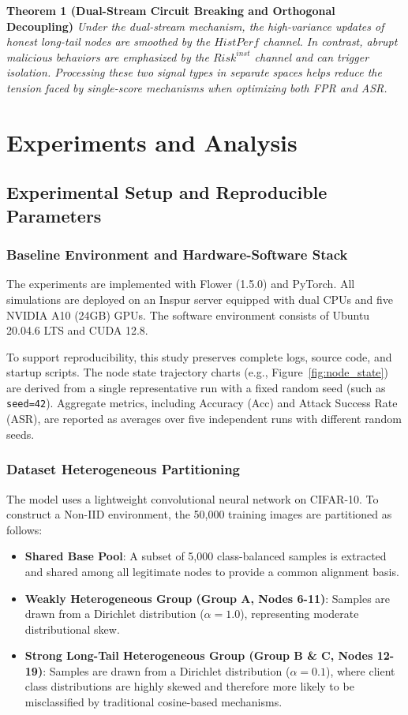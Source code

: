 \documentclass[runningheads,orivec]{llncs}
\begin{document}
\textbf{Theorem 1 (Dual-Stream Circuit Breaking and Orthogonal Decoupling)}
\textit{Under the dual-stream mechanism, the high-variance updates of honest long-tail nodes are smoothed by the $HistPerf$ channel. In contrast, abrupt malicious behaviors are emphasized by the $Risk^{inst}$ channel and can trigger isolation. Processing these two signal types in separate spaces helps reduce the tension faced by single-score mechanisms when optimizing both FPR and ASR.}

\section{Experiments and Analysis}
\label{sec:experiments}
\subsection{Experimental Setup and Reproducible Parameters}

\subsubsection{Baseline Environment and Hardware-Software Stack}
The experiments are implemented with Flower (1.5.0) and PyTorch. All simulations are deployed on an Inspur server equipped with dual CPUs and five NVIDIA A10 (24GB) GPUs. The software environment consists of Ubuntu 20.04.6 LTS and CUDA 12.8.

To support reproducibility, this study preserves complete logs, source code, and startup scripts. The node state trajectory charts (e.g., Figure~\ref{fig:node_state}) are derived from a single representative run with a fixed random seed (such as \texttt{seed=42}). Aggregate metrics, including Accuracy (Acc) and Attack Success Rate (ASR), are reported as averages over five independent runs with different random seeds.

\subsubsection{Dataset Heterogeneous Partitioning}
The model uses a lightweight convolutional neural network on CIFAR-10. To construct a Non-IID environment, the 50,000 training images are partitioned as follows:
\begin{itemize}
    \item \textbf{Shared Base Pool}: A subset of 5,000 class-balanced samples is extracted and shared among all legitimate nodes to provide a common alignment basis.
    \item \textbf{Weakly Heterogeneous Group (Group A, Nodes 6-11)}: Samples are drawn from a Dirichlet distribution ($\alpha=1.0$), representing moderate distributional skew.
    \item \textbf{Strong Long-Tail Heterogeneous Group (Group B \& C, Nodes 12-19)}: Samples are drawn from a Dirichlet distribution ($\alpha=0.1$), where client class distributions are highly skewed and therefore more likely to be misclassified by traditional cosine-based mechanisms.
\end{itemize}
\end{document}
